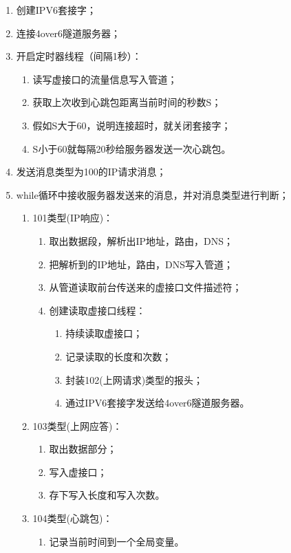 \documentclass[paper=a4, fontsize=11pt, UTF8]{article} %
\numberwithin{equation}{section} %
\numberwithin{figure}{section} %
\numberwithin{table}{section} %
\begin{document}
\begin{enumerate}
\item 创建IPV6套接字；
\item 连接4over6隧道服务器；
\item 开启定时器线程（间隔1秒）：
\begin{enumerate}
\item 读写虚接口的流量信息写入管道；
\item 获取上次收到心跳包距离当前时间的秒数S；
\item 假如S大于60，说明连接超时，就关闭套接字；
\item S小于60就每隔20秒给服务器发送一次心跳包。
\end{enumerate}
\item 发送消息类型为100的IP请求消息；
\item while循环中接收服务器发送来的消息，并对消息类型进行判断；
\begin{enumerate}
\item 101类型(IP响应)：
\begin{enumerate}
\item 取出数据段，解析出IP地址，路由，DNS；
\item 把解析到的IP地址，路由，DNS写入管道；
\item 从管道读取前台传送来的虚接口文件描述符；
\item 创建读取虚接口线程：
\begin{enumerate}
\item 持续读取虚接口；
\item 记录读取的长度和次数；
\item 封装102(上网请求)类型的报头；
\item 通过IPV6套接字发送给4over6隧道服务器。
\end{enumerate}
\end{enumerate}
\item 103类型(上网应答)：
\begin{enumerate}
\item 取出数据部分；
\item 写入虚接口；
\item 存下写入长度和写入次数。
\end{enumerate}
\item 104类型(心跳包)：
\begin{enumerate}
\item 记录当前时间到一个全局变量。
\end{enumerate}
\end{enumerate}
\end{enumerate}
\end{document}
